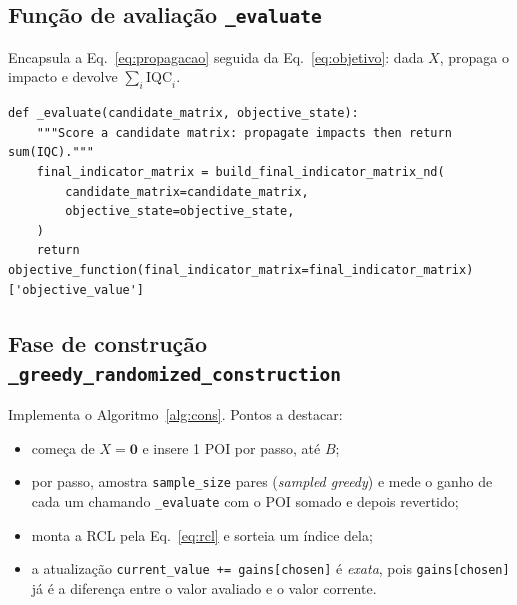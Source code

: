 \documentclass[11pt,a4paper]{article}
\begin{document}
\subsection{Função de avaliação \texttt{\_evaluate}}

Encapsula a Eq.~\eqref{eq:propagacao} seguida da
Eq.~\eqref{eq:objetivo}: dada $X$, propaga o impacto e devolve $\sum_i\mathrm{IQC}_i$.

\begin{lstlisting}[style=py,caption={Avaliação de um candidato: propaga o impacto e retorna a soma do IQC.}]
def _evaluate(candidate_matrix, objective_state):
    """Score a candidate matrix: propagate impacts then return sum(IQC)."""
    final_indicator_matrix = build_final_indicator_matrix_nd(
        candidate_matrix=candidate_matrix,
        objective_state=objective_state,
    )
    return objective_function(final_indicator_matrix=final_indicator_matrix)['objective_value']
\end{lstlisting}

\subsection{Fase de construção \texttt{\_greedy\_randomized\_construction}}

Implementa o Algoritmo~\ref{alg:cons}. Pontos a destacar:
\begin{itemize}\setlength\itemsep{1pt}
\item começa de $X=\mathbf{0}$ e insere 1 POI por passo, até $B$;
\item por passo, amostra \texttt{sample\_size} pares (\emph{sampled greedy}) e mede
o ganho de cada um chamando \texttt{\_evaluate} com o POI somado e depois revertido;
\item monta a RCL pela Eq.~\eqref{eq:rcl} e sorteia um índice dela;
\item a atualização \texttt{current\_value += gains[chosen]} é \emph{exata}, pois
\texttt{gains[chosen]} já é a diferença entre o valor avaliado e o valor corrente.
\end{itemize}
\end{document}
